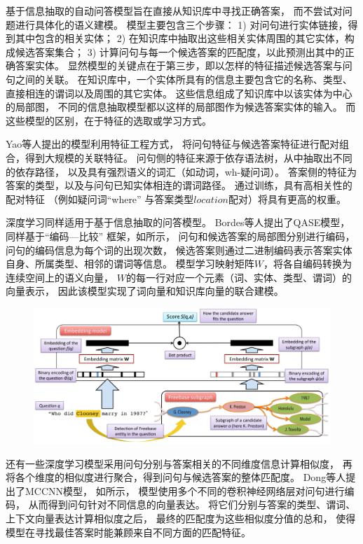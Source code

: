 基于信息抽取的自动问答模型旨在直接从知识库中寻找正确答案，
而不尝试对问题进行具体化的语义建模。
模型主要包含三个步骤：
1) 对问句进行实体链接，得到其中包含的相关实体；
2) 在知识库中抽取出这些相关实体周围的其它实体，构成候选答案集合；
3) 计算问句与每一个候选答案的匹配度，以此预测出其中的正确答案实体。
显然模型的关键点在于第三步，即以怎样的特征描述候选答案与问句之间的关联。
在知识库中，一个实体所具有的信息主要包含它的名称、类型、
直接相连的谓词以及周围的其它实体。
这些信息组成了知识库中以该实体为中心的局部图，
不同的信息抽取模型都以这样的局部图作为候选答案实体的输入。
而这些模型的区别，在于特征的选取或学习方式。

Yao等人\cite{yao2014information}提出的模型利用特征工程方式，
将问句特征与候选答案特征进行配对组合，得到大规模的关联特征。
问句侧的特征来源于依存语法树，从中抽取出不同的依存路径，
以及具有强烈语义的词汇（如动词，wh-疑问词）。
答案侧的特征为答案的类型，以及与问句已知实体相连的谓词路径。
通过训练，具有高相关性的配对特征
（例如疑问词``where'' 与答案类型$location$配对）将具有更高的权重。

深度学习同样适用于基于信息抽取的问答模型。
Bordes等人\cite{bordes2014question}提出了QASE模型，
同样基于``{编码—比较}'' 框架，如所示，
问句和候选答案的局部图分别进行编码，
问句的编码信息为每个词的出现次数，
候选答案则通过二进制编码表示答案实体自身、所属类型、相邻的谓词等信息。
模型学习映射矩阵$W$，将各自编码转换为连续空间上的语义向量，
$W$的每一行对应一个元素（词、实体、类型、谓词）的向量表示，
因此该模型实现了词向量和知识库向量的联合建模。

\begin{figure}[ht]
\centering
\includegraphics[width=0.95\columnwidth]{figure/rw/qa-qase.png}
\label{fig:rw-ir:a}
\end{figure}

还有一些深度学习模型采用问句分别与答案相关的不同维度信息计算相似度，
再将各个维度的相似度进行聚合，得到问句与候选答案的整体匹配度。
Dong等人\cite{dong2015question}提出了MCCNN模型，
如所示，
模型使用多个不同的卷积神经网络层对问句进行编码，
从而得到问句针对不同信息的向量表达。
将它们分别与答案的类型、谓词、上下文向量表达计算相似度之后，
最终的匹配度为这些相似度分值的总和，
使得模型在寻找最佳答案时能兼顾来自不同方面的匹配特征。

